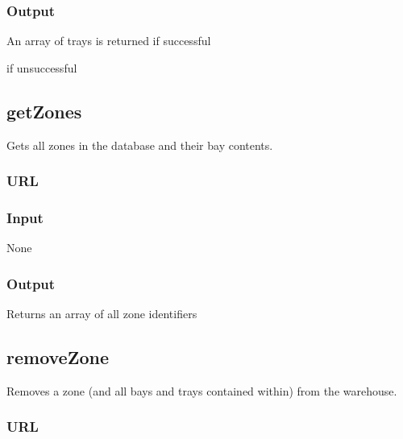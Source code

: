 \documentclass[letterpaper,10pt,english]{sphinxmanual}
\let\oldsubsection\subsection
\renewcommand{\subsection}{\needspace{6\baselineskip}\oldsubsection}
\begin{document}
\subsubsection{Output}
\label{\detokenize{docs/Developer/getBaysInZone:output}}
An array of trays is returned if successful

 if unsuccessful


\subsection{getZones}
\label{\detokenize{docs/Developer/getZones:getzones}}\label{\detokenize{docs/Developer/getZones::doc}}
Gets all zones in the database and their bay contents.


\subsubsection{URL}
\label{\detokenize{docs/Developer/getZones:url}}


\subsubsection{Input}
\label{\detokenize{docs/Developer/getZones:input}}
\begin{sphinxVerbatim}[commandchars=\\\{\}]
None
\end{sphinxVerbatim}


\subsubsection{Output}
\label{\detokenize{docs/Developer/getZones:output}}
Returns an array of all zone identifiers


\subsection{removeZone}
\label{\detokenize{docs/Developer/removeZone:removezone}}\label{\detokenize{docs/Developer/removeZone::doc}}
Removes a zone (and all bays and trays contained within) from the
warehouse.


\subsubsection{URL}
\label{\detokenize{docs/Developer/removeZone:url}}
\end{document}
